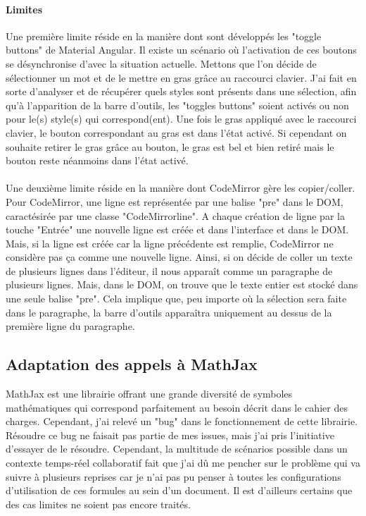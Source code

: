 \documentclass[12pt]{article}
\begin{document}
\paragraph{Limites}
Une première limite réside en la manière dont sont développés les "toggle buttons" de Material Angular. Il existe un scénario où l'activation de ces boutons se désynchronise d'avec la situation actuelle. Mettons que l'on décide de sélectionner un mot et de le mettre en gras grâce au raccourci clavier. J'ai fait en sorte d'analyser et de récupérer quels styles sont présents dans une sélection, afin qu'à l'apparition de la barre d'outils, les "toggles buttons" soient activés ou non pour le(s) style(s) qui correspond(ent). Une fois le gras appliqué avec le raccourci clavier, le bouton correspondant au gras est dans l'état activé. Si cependant on souhaite retirer le gras grâce au bouton, le gras est bel et bien retiré mais le bouton reste néanmoins dans l'état activé.
\paragraph{}
Une deuxième limite réside en la manière dont CodeMirror gère les copier/coller. Pour CodeMirror, une ligne est représentée par une balise "pre" dans le DOM, caractésirée par une classe "CodeMirrorline". A chaque création de ligne par la touche "Entrée" une nouvelle ligne est créée et dans l'interface et dans le DOM. Mais, si la ligne est créée car la ligne précédente est remplie, CodeMirror ne considère pas ça comme une nouvelle ligne. Ainsi, si on décide de coller un texte de plusieurs lignes dans l'éditeur, il nous apparaît comme un paragraphe de plusieurs lignes. Mais, dans le DOM, on trouve que le texte entier est stocké dans une seule balise "pre". Cela implique que, peu importe où la sélection sera faite dans le paragraphe, la barre d'outils apparaîtra uniquement au dessus de la première ligne du paragraphe.

\newpage
\subsection{Adaptation des appels à MathJax}
MathJax est une librairie offrant une grande diversité de symboles mathématiques qui correspond parfaitement au besoin décrit dans le cahier des charges. Cependant, j'ai relevé un "bug" dans le fonctionnement de cette librairie. Résoudre ce bug ne faisait pas partie de mes issues, mais j'ai pris l'initiative d'essayer de le résoudre. Cependant, la multitude de scénarios possible dans un contexte temps-réel collaboratif fait que j'ai dû me pencher sur le problème qui va suivre à plusieurs reprises car je n'ai pas pu penser à toutes les configurations d'utilisation de ces formules au sein d'un document. Il est d'ailleurs certains que des cas limites ne soient pas encore traités.
\end{document}
